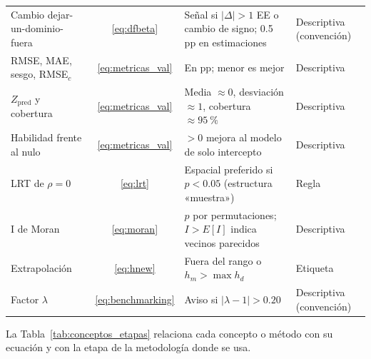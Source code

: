 \begin{table}[!htbp]
\begin{tabularx}{\linewidth}{>{\raggedright\arraybackslash}p{3.0cm} c >{\raggedright\arraybackslash}X >{\raggedright\arraybackslash}p{2.2cm}}
Cambio dejar-un-dominio-fuera & \ref{eq:dfbeta} & Señal si $|\Delta| > 1$ EE o cambio de signo; 0.5 pp en estimaciones & Descriptiva (convención) \\
RMSE, MAE, sesgo, RMSE$_c$ & \ref{eq:metricas_val} & En pp; menor es mejor & Descriptiva \\
$Z_{\text{pred}}$ y cobertura & \ref{eq:metricas_val} & Media $\approx 0$, desviación $\approx 1$, cobertura $\approx 95~\%$ & Descriptiva \\
Habilidad frente al nulo & \ref{eq:metricas_val} & $> 0$ mejora al modelo de solo intercepto & Descriptiva \\
LRT de $\rho = 0$ & \ref{eq:lrt} & Espacial preferido si $p < 0.05$ (estructura «muestra») & Regla \cite{morales2021smallarea} \\
I de Moran & \ref{eq:moran} & $p$ por permutaciones; $I > E[I]$ indica vecinos parecidos & Descriptiva \cite{Moran1950} \\
Extrapolación & \ref{eq:hnew} & Fuera del rango o $h_m > \max h_d$ & Etiqueta \cite{MontgomeryPeckVining2012} \\
Factor $\lambda$ & \ref{eq:benchmarking} & Aviso si $|\lambda - 1| > 0.20$ & Descriptiva (convención) \\
\bottomrule
\end{tabularx}
\end{table}

La Tabla~\ref{tab:conceptos_etapas} relaciona cada concepto o método con su ecuación y con la etapa de la metodología donde se usa.


